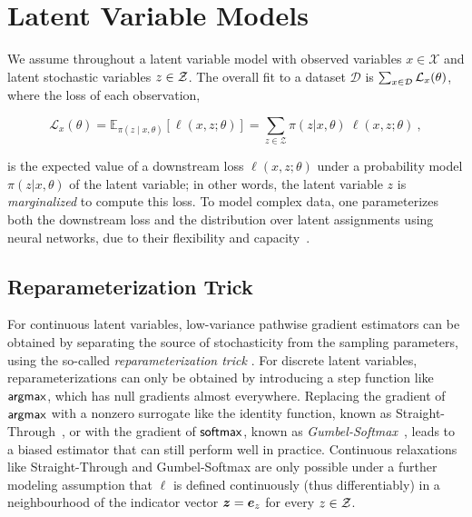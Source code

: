 \section{Latent Variable Models}
\label{sec:lvm}

We assume throughout a latent variable model with observed variables
$x \in \mathcal{X}$ and latent stochastic variables $z \in \mathcal{Z}$. The
overall fit to a dataset $\mathcal D$ is $\sum_{x \in \mathcal{D}}
\mathcal{L}_x(\theta)$, where the loss of each observation,

\begin{equation}\label{eq:fit}
    \mathcal{L}_{x}(\theta) =
    \mathbb E_{\pi(z \mid x, \theta)}
    \left[ \ell(x, z; \theta)\right] =
    \sum_{z \in \mathcal Z} \pi(z | x, \theta)~\ell(x, z; \theta) ~,
\end{equation}

\noindent is the expected value of a downstream loss $\ell(x,z;\theta)$ under a
probability model $\pi(z|x,\theta)$ of the latent variable; in other
words, the latent variable $z$ is {\it marginalized} to compute this loss.
To model complex data, one parameterizes both the downstream loss and
the distribution over latent assignments using neural networks, due
to their flexibility and capacity~\citep{Kingma+2014:VAE}.

\subsection{Reparameterization Trick}

For continuous latent variables,
low-variance pathwise gradient estimators can be obtained by
separating the source of stochasticity from the sampling parameters,
using the so-called \emph{reparameterization trick}
\citep{Kingma+2014:VAE,RezendeEtAl14VAE}. For discrete latent
variables, reparameterizations can only be obtained by introducing a
step function like $\operatorname*{\mathsf{argmax}}$, which has null gradients almost everywhere.
Replacing the gradient of $\operatorname*{\mathsf{argmax}}$ with a nonzero surrogate like the identity
function, known as Straight-Through~\citep{STE}, or with the gradient of $\operatorname*{\mathsf{softmax}}$, known
as \emph{Gumbel-Softmax}~\citep{Concrete,GumbelSoftmax}, leads to a
biased estimator that can still perform well in practice. Continuous
relaxations like Straight-Through and Gumbel-Softmax are only
possible under a further modeling assumption that $\ell$ is defined
continuously (thus differentiably) in a neighbourhood of the
indicator vector $\bm{z} = \bm{e}_{z}$ for every $z \in \mathcal{Z}$.

